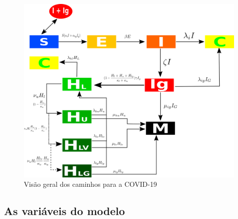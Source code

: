 \documentclass{article}
\begin{document}
\begin{figure}[!h]
\centering
\includegraphics[scale=0.4]{covid}
\caption{Visão geral dos caminhos para a COVID-19}
\label{fig:universe}
\end{figure}

\subsection{As variáveis do modelo}
\end{document}
